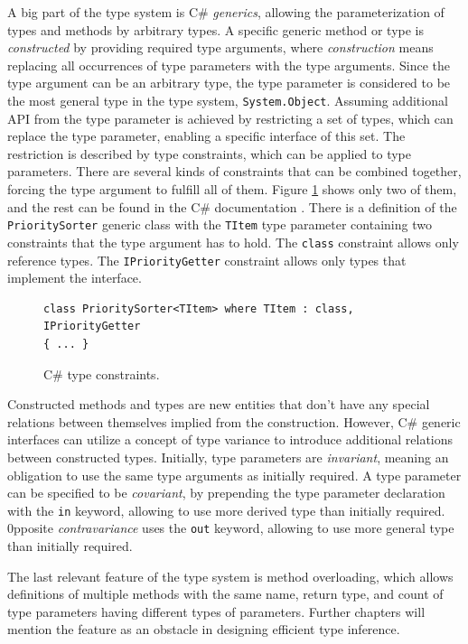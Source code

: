 \par
A big part of the type system is C\# \textit{generics}, allowing the parameterization of types and methods by arbitrary types. 
A specific generic method or type is \textit{constructed} by providing required type arguments, where \textit{construction} means replacing all occurrences of type parameters with the type arguments. 
Since the type argument can be an arbitrary type, the type parameter is considered to be the most general type in the type system, \texttt{System.Object}. 
Assuming additional API from the type parameter is achieved by restricting a set of types, which can replace the type parameter, enabling a specific interface of this set. 
The restriction is described by type constraints, which can be applied to type parameters. 
There are several kinds of constraints that can be combined together, forcing the type argument to fulfill all of them. 
Figure \ref{img05:typeConst} shows only two of them, and the rest can be found in the C\# documentation \cite{online:csharpTypeConst}. 
There is a definition of the \texttt{PrioritySorter} generic class with the \texttt{TItem} type parameter containing two constraints that the type argument has to hold. 
The \texttt{class} constraint allows only reference types. 
The \texttt{IPriorityGetter} constraint allows only types that implement the
interface.
\begin{figure}[h]
\begin{lstlisting}[style=csharp]
class PrioritySorter<TItem> where TItem : class, IPriorityGetter 
{ ... }
\end{lstlisting}
\caption{C\# type constraints.}
\label{img05:typeConst}
\end{figure}
\par
Constructed methods and types are new entities that don’t have any special relations between themselves implied from the construction. 
However, C\# generic interfaces can utilize a concept of type variance to introduce additional relations between constructed types. 
Initially, type parameters are \textit{invariant}, meaning an obligation to use the same type arguments as initially required. 
A type parameter can be specified to be \textit{covariant}, by prepending the type parameter declaration with the \texttt{in} keyword, allowing to use more derived type than initially required. 
0pposite \textit{contravariance} uses the \texttt{out} keyword, allowing to use
more general type than initially required.
\par
The last relevant feature of the type system is method overloading, which
allows definitions of multiple methods with the same name, return type, and count of type parameters having different types of parameters. 
Further chapters will mention the feature as an obstacle in designing efficient type inference.

